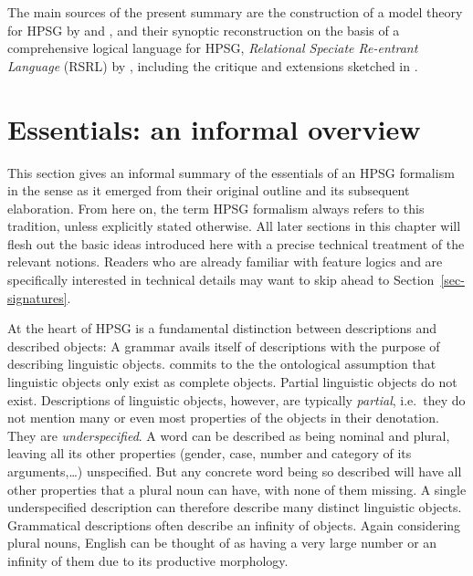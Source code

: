 \documentclass[output=paper
                ,modfonts
                ,nonflat
	        ,collection
	        ,collectionchapter
	        ,collectiontoclongg
 	        ,biblatex
                ,babelshorthands
                ,newtxmath
                ,draftmode
                ,colorlinks, citecolor=brown
]{./langsci/langscibook}
\begin{document}
{%

The main sources of the present summary are the construction of a model
theory for HPSG by \citet{King99a-u} and \citet{Pollard99a}, and their
synoptic reconstruction on the basis of  a comprehensive logical language
for HPSG, \emph{Relational Speciate Re-entrant Language} (RSRL) by
\citet{Richter2004a-u}, including the critique and extensions sketched
in \citet{Richter2007a}.


\section{Essentials: an informal overview}
\label{sec-essentials}


This section gives an informal summary of the essentials of an HPSG
formalism in the sense \cite{PollardSag1994} as it emerged from their
original outline and its subsequent elaboration. From here on, the term
HPSG formalism always refers to this tradition, unless explicitly
stated otherwise.  All later sections in this chapter will flesh out
the basic ideas introduced here with a precise technical treatment of
the relevant notions. Readers who are already familiar with feature
logics and are specifically interested in technical details may want
to skip ahead to Section~\ref{sec-signatures}.

At the heart of HPSG is a fundamental distinction between descriptions
and described objects: A grammar avails itself of descriptions with
the purpose of describing linguistic objects.  \cite{PollardSag1994}
commits to the the ontological assumption that linguistic objects only
exist as complete objects. Partial linguistic objects do not
exist. Descriptions of linguistic objects, however, are typically
\emph{partial}, i.e.\ they do not mention many or even most properties of the
objects in their denotation. They are \emph{underspecified}.
A word can be described as being nominal
and plural, leaving all its other properties (gender, case, number and
category of its arguments,\ldots) unspecified. But any
concrete word being so described will have all other properties that
a plural noun can have, with none of them missing.
A single underspecified description can therefore
describe many distinct linguistic objects. Grammatical descriptions
often describe an infinity of objects. Again considering plural nouns,
English can be thought of as having a very large number or an infinity
of them due to its productive morphology.

}
\end{document}
